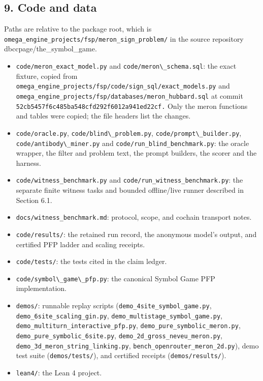 \documentclass[
  11pt,
]{article}
\newcommand{\passthrough}[1]{#1}
\providecommand{\tightlist}{%
  \setlength{\itemsep}{0pt}\setlength{\parskip}{0pt}}
\begin{document}
\subsection{9. Code and data}\label{code-and-data}

Paths are relative to the package root, which is
\nolinkurl{omega_engine_projects/fsp/meron_sign_problem/} in the source
repository
dbccpage/the\_symbol\_game.

\begin{itemize}
\tightlist
\item
  \nolinkurl{code/meron_exact_model.py} and
  \passthrough{\lstinline!code/meron\_schema.sql!}: the exact fixture,
  copied from
  \nolinkurl{omega_engine_projects/fsp/code/sign_sql/exact_models.py}
  and \nolinkurl{omega_engine_projects/fsp/databases/meron_hubbard.sql}
  at commit \nolinkurl{52cb5457f6c485ba548cfd292f6012a941ed22cf.} Only
  the meron functions and tables were copied; the file headers list the
  changes.
\item
  \passthrough{\lstinline!code/oracle.py!},
  \passthrough{\lstinline!code/blind\_problem.py!},
  \passthrough{\lstinline!code/prompt\_builder.py!},
  \passthrough{\lstinline!code/antibody\_miner.py!} and
  \nolinkurl{code/run_blind_benchmark.py}: the oracle wrapper, the
  filter and problem text, the prompt builders, the scorer and the
  harness.
\item
  \nolinkurl{code/witness_benchmark.py} and
  \nolinkurl{code/run_witness_benchmark.py}: the separate finite witness
  tasks and bounded offline/live runner described in Section 6.1.
\item
  \nolinkurl{docs/witness_benchmark.md}: protocol, scope, and cochain
  transport notes.
\item
  \passthrough{\lstinline!code/results/!}: the retained run record, the
  anonymous model's output, and certified PFP ladder and scaling
  receipts.
\item
  \passthrough{\lstinline!code/tests/!}: the tests cited in the claim
  ledger.
\item
  \passthrough{\lstinline!code/symbol\_game\_pfp.py!}: the canonical
  Symbol Game PFP implementation.
\item
  \passthrough{\lstinline!demos/!}: runnable replay scripts
  (\nolinkurl{demo_4site_symbol_game.py},
  \nolinkurl{demo_6site_scaling_gin.py},
  \nolinkurl{demo_multistage_symbol_game.py},
  \nolinkurl{demo_multiturn_interactive_pfp.py},
  \nolinkurl{demo_pure_symbolic_meron.py},
  \nolinkurl{demo_pure_symbolic_6site.py},
  \nolinkurl{demo_2d_gross_neveu_meron.py},
  \nolinkurl{demo_3d_meron_string_linking.py},
  \nolinkurl{bench_openrouter_meron_2d.py}), demo test suite
  (\passthrough{\lstinline!demos/tests/!}), and certified receipts
  (\passthrough{\lstinline!demos/results/!}).
\item
  \passthrough{\lstinline!lean4/!}: the Lean 4 project.
\end{itemize}
\end{document}
